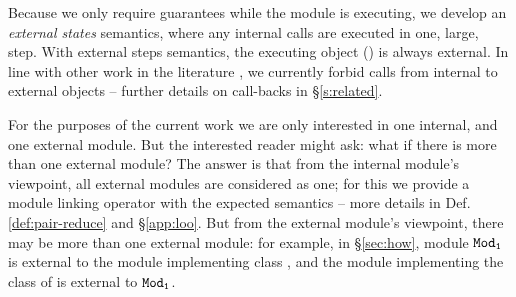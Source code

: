 %
%
Because we only require guarantees while 
the  \externalM module  is executing,
we develop an \emph{external states} semantics, where
 any internal calls are executed in one, large, step.
With external steps semantics,  the executing object () is always   external. 
  In line  with other work in the literature \cite{Permenev, Grossman, Albert}, we currently forbid 
  calls from internal to  external objects
  -- further details on call-backs in \S\ref{s:related}. 

{For the purposes of the current work we are only interested in one internal, and one external module.
But the interested reader might ask: what if there is more than one external module?
The answer is that from the internal module's viewpoint, all external modules are considered as one;
for this we provide a module linking operator with  the expected semantics -- more details in Def. \ref{def:pair-reduce} and \S \ref{app:loo}. 
But from the external module's viewpoint, there may be more than one external module: for example, in \S \ref{sec:how}, 
module ${\texttt{Mod}}_{{\texttt{1}}}$ is external to the module   implementing class , and the module 
implementing the class of  is external to
${\texttt{Mod}}_{{\texttt{1}}}$.
}

%

\newcommand{\vertsp} {\vspace{.05in}} 
 
